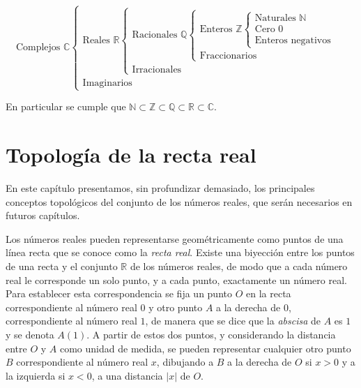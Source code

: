 \documentclass[
  a4paper,
]{scrreport}
\theoremstyle{plain}
\theoremstyle{plain}
\theoremstyle{definition}
\theoremstyle{definition}
\theoremstyle{plain}
\theoremstyle{definition}
\theoremstyle{remark}
\begin{document}
\[
\mbox{Complejos } \mathbb{C}
    \begin{cases}
    \mbox{Reales } \mathbb{R}
    \begin{cases}
        \mbox{Racionales } \mathbb{Q}
        \begin{cases}
            \mbox{Enteros } \mathbb{Z}
            \begin{cases}
                \mbox{Naturales } \mathbb{N} \\
                \mbox{Cero } 0\\
                \mbox{Enteros negativos}
                \end{cases}\\
            \mbox{Fraccionarios}
        \end{cases}\\
        \mbox{Irracionales}
    \end{cases}\\
    \mbox{Imaginarios}
    \end{cases}
\]

En particular se cumple que
\(\mathbb{N} \subset \mathbb{Z} \subset \mathbb{Q} \subset \mathbb{R} \subset \mathbb{C}\).


\hypertarget{topologuxeda-de-la-recta-real}{%
\chapter{Topología de la recta
real}\label{topologuxeda-de-la-recta-real}}

En este capítulo presentamos, sin profundizar demasiado, los principales
conceptos topológicos del conjunto de los números reales, que serán
necesarios en futuros capítulos.

Los números reales pueden representarse geométricamente como puntos de
una línea recta que se conoce como la \emph{recta real}. Existe una
biyección entre los puntos de una recta y el conjunto \(\mathbb{R}\) de
los números reales, de modo que a cada número real le corresponde un
solo punto, y a cada punto, exactamente un número real. Para establecer
esta correspondencia se fija un punto \(O\) en la recta correspondiente
al número real \(0\) y otro punto \(A\) a la derecha de \(0\),
correspondiente al número real \(1\), de manera que se dice que la
\emph{abscisa} de \(A\) es \(1\) y se denota \(A(1)\). A partir de estos
dos puntos, y considerando la distancia entre \(O\) y \(A\) como unidad
de medida, se pueden representar cualquier otro punto \(B\)
correspondiente al número real \(x\), dibujando a \(B\) a la derecha de
\(O\) si \(x>0\) y a la izquierda si \(x<0\), a una distancia \(|x|\) de
\(O\).
\end{document}
